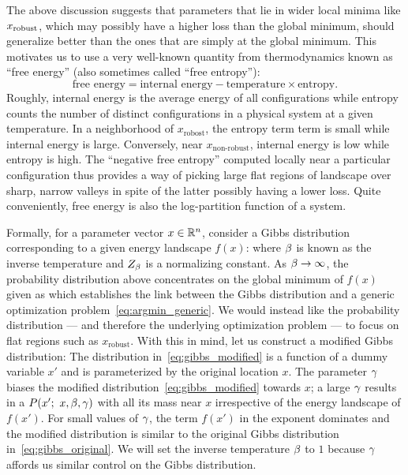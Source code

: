 \documentclass[10pt]{article}
\begin{document}
The above discussion suggests that parameters that lie in wider local minima like $x_{\mathrm{robust}}$, which may possibly have a higher loss than the global minimum, should generalize better than the ones that are simply at the global minimum. This motivates us to use a very well-known quantity from thermodynamics known as ``free energy'' (also sometimes called ``free entropy''):
$$
    \textrm{free energy} = \textrm{internal energy} - \textrm{temperature} \times \textrm{entropy}.
$$
Roughly, internal energy is the average energy of all configurations while entropy counts the number of distinct configurations in a physical system at a given temperature. In a neighborhood of $x_{\textrm{robost}}$, the entropy term term is small while internal energy is large. Conversely, near $x_{\textrm{non-robust}}$, internal energy is low while entropy is high. The ``negative free entropy'' computed locally near a particular configuration thus provides a way of picking large flat regions of landscape over sharp, narrow valleys in spite of the latter possibly having a lower loss. Quite conveniently, free energy is also the log-partition function of a system.

Formally, for a parameter vector $x \in \mathbb{R}^n$, consider a Gibbs distribution corresponding to a given energy landscape $f(x)$:
where $\beta$ is known as the inverse temperature and $Z_\beta$ is a normalizing constant. As $\beta \to \infty$, the probability distribution above concentrates on the global minimum of $f(x)$ given as
which establishes the link between the Gibbs distribution and a generic optimization problem~\eqref{eq:argmin_generic}. We would instead like the probability distribution --- and therefore the underlying optimization problem --- to focus on flat regions such as $x_{\textrm{robust}}$. With this in mind, let us construct a modified Gibbs distribution:
The distribution in~\eqref{eq:gibbs_modified} is a function of a dummy variable $x'$ and is parameterized by the original location $x$. The parameter $\gamma$ biases the modified distribution~\eqref{eq:gibbs_modified} towards $x$; a large $\gamma$ results in a $P(x';\ x,\beta,\gamma)$ with all its mass near $x$ irrespective of the energy landscape of $f(x')$. For small values of $\gamma$, the term $f(x')$ in the exponent dominates and the modified distribution is similar to the original Gibbs distribution in~\eqref{eq:gibbs_original}. We will set the inverse temperature $\beta$ to $1$ because $\gamma$ affords us similar control on the Gibbs distribution.
\end{document}
